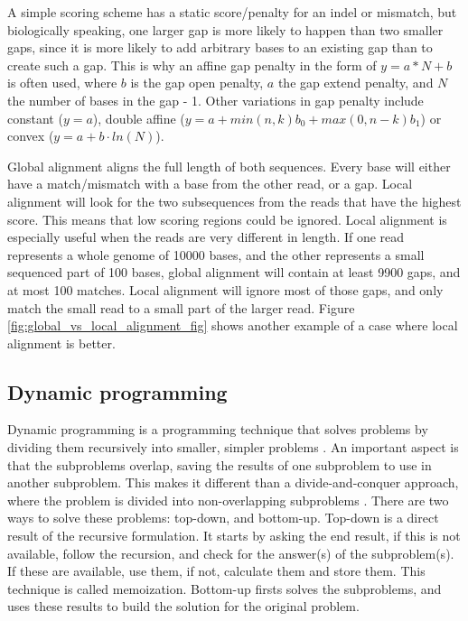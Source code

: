 \documentclass[../main/thesis.tex]{subfiles}
\begin{document}
A simple scoring scheme has a static score/penalty for an indel or mismatch, but biologically speaking, one larger gap is more likely to happen than two smaller gaps, since it is more likely to add arbitrary bases to an existing gap than to create such a gap.
This is why an affine gap penalty in the form of $y = a*N+b$ is often used, where $b$ is the gap open penalty, $a$ the gap extend penalty, and $N$ the number of bases in the gap - 1.
Other variations in gap penalty include constant ($y = a$), double affine ($y = a + min(n,k)b_0 + max(0,n-k)b_1$) or convex ($y = a+b\cdot ln(N)$).

Global alignment aligns the full length of both sequences.
Every base will either have a match/mismatch with a base from the other read, or a gap.
Local alignment will look for the two subsequences from the reads that have the highest score.
This means that low scoring regions could be ignored.
Local alignment is especially useful when the reads are very different in length.
If one read represents a whole genome of 10000 bases, and the other represents a small sequenced part of 100 bases, global alignment will contain at least 9900 gaps, and at most 100 matches.
Local alignment will ignore most of those gaps, and only match the small read to a small part of the larger read.
Figure \ref{fig:global_vs_local_alignment_fig} shows another example of a case where local alignment is better.


\subsection{Dynamic programming}
Dynamic programming is a programming technique that solves problems by dividing them recursively into smaller, simpler problems \cite{Dynamic_programming1}.
An important aspect is that the subproblems overlap, saving the results of one subproblem to use in another subproblem.
This makes it different than a divide-and-conquer approach, where the problem is divided into non-overlapping subproblems \cite{Dynamic_programming2}.
There are two ways to solve these problems: top-down, and bottom-up.
Top-down is a direct result of the recursive formulation.
It starts by asking the end result, if this is not available, follow the recursion, and check for the answer(s) of the subproblem(s).
If these are available, use them, if not, calculate them and store them.
This technique is called memoization.
Bottom-up firsts solves the subproblems, and uses these results to build the solution for the original problem.
\end{document}
